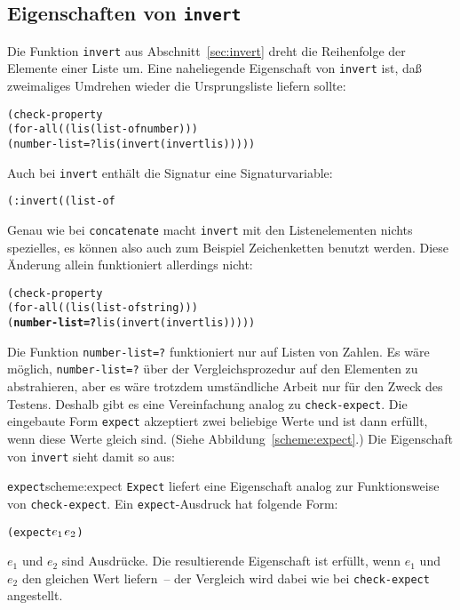 \subsection{Eigenschaften von \texttt{invert}}

Die Funktion \texttt{invert} aus Abschnitt~\ref{sec:invert} dreht die
Reihenfolge der Elemente einer Liste um.  Eine naheliegende
Eigenschaft von \texttt{invert} ist, daß zweimaliges Umdrehen wieder
die Ursprungsliste liefern sollte:
%
\begin{alltt}
(check-property
 (for-all ((lis (list-of number)))
   (number-list=? lis (invert (invert lis)))))
\end{alltt}
%
Auch bei \texttt{invert} enthält die Signatur eine Signaturvariable:
%
\begin{alltt}
(: invert ((list-of %a) -> (list-of %a)))
\end{alltt}
%
Genau wie bei \texttt{concatenate} macht \texttt{invert} mit den
Listenelementen nichts spezielles, es können also auch zum Beispiel Zeichenketten
benutzt werden.  Diese Änderung allein funktioniert allerdings nicht:
%
\begin{alltt}
(check-property
 (for-all ((lis (list-of string)))
   (\textbf{number-list=?} lis (invert (invert lis)))))
\end{alltt}
%
Die Funktion \texttt{number-list=?} funktioniert nur auf Listen von
Zahlen.  Es wäre möglich, \texttt{number-list=?} über der
Vergleichsprozedur auf den Elementen zu abstrahieren, aber es wäre
trotzdem umständliche Arbeit nur für den Zweck des Testens.  Deshalb 
gibt es eine Vereinfachung analog zu \texttt{check-expect}.  Die eingebaute Form \texttt{expect}
akzeptiert zwei beliebige Werte und ist dann erfüllt, wenn diese Werte
gleich sind.  (Siehe Abbildung~\ref{scheme:expect}.)  Die Eigenschaft
von \texttt{invert} sieht damit so aus:

\begin{feature}{\texttt{expect}}{scheme:expect}
  \texttt{Expect} liefert eine
  Eigenschaft analog zur Funktionsweise von
  \texttt{check-expect}.  Ein \texttt{expect}-Ausdruck hat folgende
  Form:
\begin{alltt}
(expect \(e\sb{1}\)  \(e\sb{2}\))
\end{alltt}
%
$e_1$ und $e_2$ sind Ausdrücke.  Die resultierende Eigenschaft ist
erfüllt, wenn $e_1$ und $e_2$ den gleichen Wert liefern~-- der
Vergleich wird dabei wie bei \texttt{check-expect} angestellt.

\end{feature}

